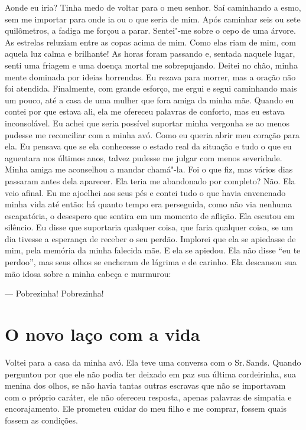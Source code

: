 Aonde eu iria? Tinha medo de voltar
para o meu senhor. Saí caminhando a esmo, sem me importar para onde ia
ou o que seria de mim. Após caminhar seis ou sete quilômetros, a fadiga
me forçou a parar. Sentei"-me sobre o cepo de uma árvore. As estrelas
reluziam entre as copas acima de mim. Como elas riam de mim, com aquela
luz calma e brilhante! As horas foram passando e, sentada naquele lugar,
senti uma friagem e uma doença mortal me sobrepujando. Deitei no chão,
minha mente dominada por ideias horrendas. Eu rezava para morrer, mas a
oração não foi atendida. Finalmente, com grande esforço, me ergui e
segui caminhando mais um pouco, até a casa de uma mulher que fora amiga
da minha mãe. Quando eu contei por que estava ali, ela me ofereceu
palavras de conforto, mas eu estava inconsolável. Eu achei que seria
possível suportar minha vergonha se ao menos pudesse me reconciliar com
a minha avó. Como eu queria abrir meu coração para ela. Eu pensava que
se ela conhecesse o estado real da situação e tudo o que eu aguentara
nos últimos anos, talvez pudesse me julgar com menos severidade. Minha
amiga me aconselhou a mandar chamá"-la. Foi o que fiz, mas vários dias
passaram antes dela aparecer. Ela teria me abandonado por completo? Não.
Ela veio afinal. Eu me ajoelhei aos seus pés e contei tudo o que havia
envenenado minha vida até então: há quanto tempo era perseguida, como
não via nenhuma escapatória, o desespero que sentira em um momento de
aflição. Ela escutou em silêncio. Eu disse que suportaria qualquer
coisa, que faria qualquer coisa, se um dia tivesse a esperança de
receber o seu perdão. Implorei que ela se apiedasse de mim, pela memória
da minha falecida mãe. E ela se apiedou. Ela não disse ``eu te perdoo'',
mas seus olhos se encheram de lágrima e de carinho. Ela descansou sua
mão idosa sobre a minha cabeça e murmurou:

--- Pobrezinha! Pobrezinha!

\chapter*{O novo laço com a vida}

Voltei para a casa da minha avó. Ela
teve uma conversa com o Sr.\,Sands. Quando perguntou por que ele não
podia ter deixado em paz sua última cordeirinha, sua menina dos olhos,
se não havia tantas outras escravas que não se importavam com o próprio
caráter, ele não ofereceu resposta, apenas palavras de simpatia e
encorajamento. Ele prometeu cuidar do meu filho e me comprar, fossem
quais fossem as condições.

